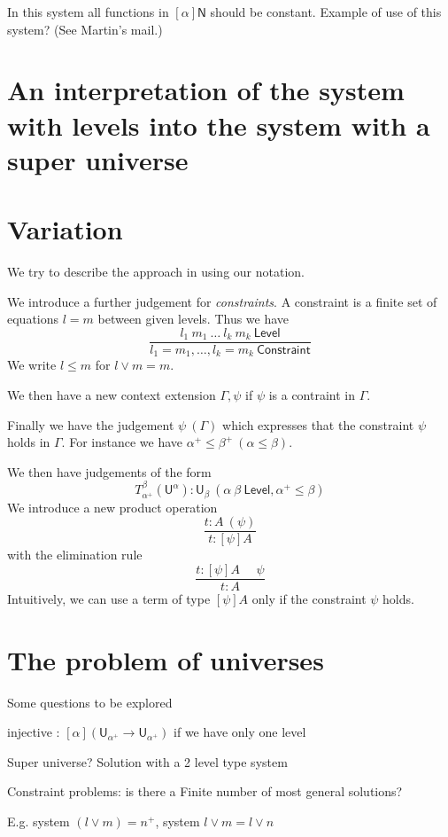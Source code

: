 \documentclass[10pt,a4paper]{article}
\def\NN{\mathsf{N}}
\def\UU{\mathsf{U}}
\def\Level{\mathsf{Level}}
\def\Constraint{\mathsf{Constraint}}
\begin{document}
In this system all functions in $[\alpha]\NN$
should be constant. Example of use of this system? (See Martin's mail.)

\section*{An interpretation of the system with levels into the system with a super universe}

\section*{Variation}

We try to describe the approach in \cite{VV} using our notation.

We introduce a further judgement for {\em constraints}. A constraint is
a finite set of equations $l = m$ between given levels. Thus we have
$$
\frac{l_1~m_1~\dots~l_k~m_k~\Level}{l_1 = m_1,\dots,l_k = m_k~\Constraint}
$$
We write $l\leqslant m$ for $l\vee m = m$.

We then have a new context extension $\Gamma,\psi$ if $\psi$ is a contraint in $\Gamma$.

Finally we have the judgement $\psi~(\Gamma)$ which expresses that the constraint $\psi$
holds in $\Gamma$. For instance we have $\alpha^+\leqslant\beta^+~(\alpha\leqslant\beta)$.

We then have judgements of the form
$$
T_{\alpha^+}^{\beta}(\UU^{\alpha}):\UU_{\beta}~(\alpha~\beta~\Level,\alpha^+\leqslant\beta)
$$
We introduce a new product operation
$$
\frac{t:A~(\psi)}{t:[\psi]A}
$$
with the elimination rule
$$
\frac{t:[\psi]A~~~~~~\psi}{t:A}
$$
Intuitively, we can use a term of type $[\psi]A$ only if the constraint $\psi$ holds.


\section*{The problem of universes}

Some questions to be explored

\medskip

injective : $[\alpha](\UU_{\alpha^+}\rightarrow \UU_{\alpha^+})$ if we have only one level

Super universe? Solution with a 2 level type system

Constraint problems: is there a Finite number of most general solutions?

E.g. system $(l\vee m) = n^+$, system $l\vee m  = l\vee n$
\end{document}
